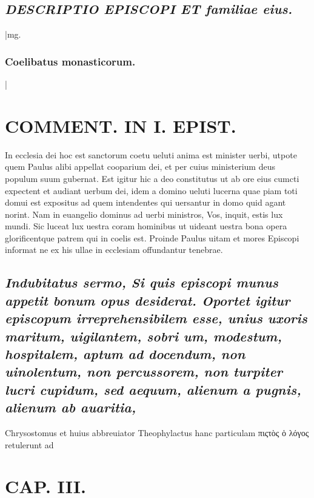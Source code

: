 \documentclass{article}
\begin{document}
\begin{pages}
\subsection*{\textit{DESCRIPTIO EPISCOPI ET familiae eius. }}
|mg. \subsubsection*{Coelibatus monasticorum. }|
\section*{COMMENT. IN I. EPIST. }\pstart In ecclesia dei hoc est sanctorum coetu ueluti anima est minister uerbi, utpote quem Paulus alibi appellat cooparium dei, et per cuius ministerium deus populum suum gubernat. Est igitur hic a deo constitutus ut ab ore eius cumcti expectent et audiant uerbum dei, idem a domino ueluti lucerna quae piam toti domui est expositus ad quem intendentes qui uersantur in domo quid agant norint. Nam in euangelio dominus ad uerbi ministros, Vos, inquit, estis lux mundi. Sic luceat lux uestra coram hominibus ut uideant uestra bona opera glorificentque patrem qui in coelis est. Proinde Paulus uitam et mores Episcopi informat ne ex his ullae in ecclesiam offundantur tenebrae.  \pend
{}
{}
\subsection*{\textit{Indubitatus sermo, Si quis episcopi munus appetit bonum opus desiderat. Oportet igitur episcopum irreprehensibilem esse, unius uxoris maritum, uigilantem, sobri um, modestum, hospitalem, aptum ad docendum, non uinolentum, non percussorem, non turpiter lucri cupidum, sed aequum, alienum a pugnis, alienum ab auaritia, }}\pstart Chrysostomus et huius abbreuiator Theophylactus hanc particulam πιςτὸς ὁ λόγος retulerunt ad  \pend
\endnumbering\beginnumbering\section{CAP. III.}
\endnumbering
\end{pages}
\end{document}

